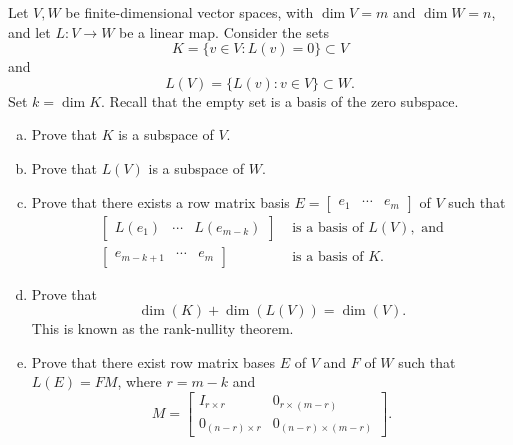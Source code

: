 \begin{exercise}
  \label{ex:hw03:kernel-image-and-adapted-bases}
  Let \(V,W\) be finite-dimensional vector spaces, with
  \(\dim V=m\) and \(\dim W=n\), and let \(L:V\to W\) be a linear
  map. Consider the sets
  \[
    K=\{v\in V:L(v)=0\}\subset V
  \]
  and
  \[
    L(V)=\{L(v):v\in V\}\subset W.
  \]
  Set \(k=\dim K\).
  Recall that the empty set is a basis of the zero subspace.
  \begin{enumerate}[(a)][2]
    \item Prove that \(K\) is a subspace of \(V\).
    \item Prove that \(L(V)\) is a subspace of \(W\).
    \item Prove that there exists a row matrix basis
      \(E=\begin{bmatrix}e_1&\cdots&e_m\end{bmatrix}\) of \(V\)
      such that
      \[
        \begin{aligned}
          \begin{bmatrix}L(e_1)&\cdots&L(e_{m-k})\end{bmatrix}
            &\text{ is a basis of }L(V),\text{ and}\\
          \begin{bmatrix}e_{m-k+1}&\cdots&e_m\end{bmatrix}
            &\text{ is a basis of }K.
        \end{aligned}
      \]
    \item Prove that
      \[
        \dim(K)+\dim(L(V))=\dim(V).
      \]
      This is known as the rank-nullity theorem.
    \item Prove that there exist row matrix bases \(E\) of \(V\) and
      \(F\) of \(W\) such that \(L(E)=FM\), where \(r=m-k\) and
      \[
        M=\left[
          \begin{array}{c|c}
            I_{r\times r}&0_{r\times(m-r)}\\
            \hline
            0_{(n-r)\times r}&0_{(n-r)\times(m-r)}
          \end{array}
        \right].
      \]
  \end{enumerate}
\end{exercise}
